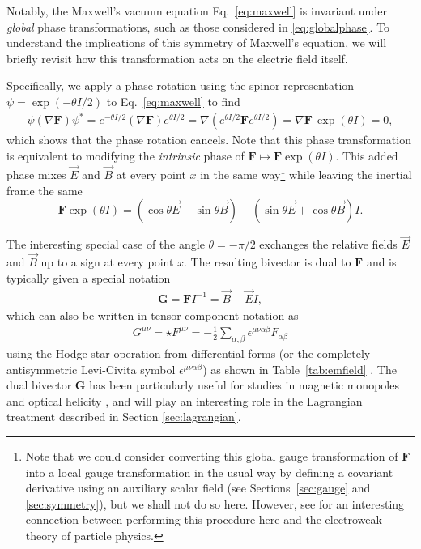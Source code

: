 \documentclass[1p,sort&compress]{elsarticle}
\numberwithin{equation}{section}
\newcommand{\rv}[1]{\vec{#1}}
\newcommand{\bv}[1]{\mathbf{#1}}
\begin{document}
Notably, the Maxwell's vacuum equation Eq.~\eqref{eq:maxwell} is invariant under \emph{global} phase transformations, such as those considered in \eqref{eq:globalphase}.  To understand the implications of this symmetry of Maxwell's equation, we will briefly revisit how this transformation acts on the electric field itself.

Specifically, we apply a phase rotation using the spinor representation $\psi = \exp(-\theta I / 2)$ to Eq.~\eqref{eq:maxwell} to find
\begin{align}\label{eq:dualsymmetry}
  \psi(\nabla \bv{F})\psi^* = e^{-\theta I /2}(\nabla \bv{F})e^{\theta I/2} = \nabla(e^{\theta I/2}\bv{F}e^{\theta I/2}) = \nabla \bv{F}\,\exp(\theta I) = 0,
\end{align}
which shows that the phase rotation cancels.  Note that this phase transformation is equivalent to modifying the \emph{intrinsic} phase of $\bv{F} \mapsto \bv{F} \exp(\theta I)$.  This added phase mixes $\rv{E}$ and $\rv{B}$ at every point $x$ in the same way\footnote{Note that we could consider converting this global gauge transformation of $\bv{F}$ into a local gauge transformation in the usual way by defining a covariant derivative using an auxiliary scalar field (see Sections~\ref{sec:gauge} and \ref{sec:symmetry}), but we shall not do so here.  However, see \cite{Vasconcellos2014} for an interesting connection between performing this procedure here and the electroweak theory of particle physics.} while leaving the inertial frame the same
\begin{equation}
  \bv{F} \exp(\theta I) = (\cos\theta \rv{E} - \sin\theta \rv{B}) + (\sin\theta \rv{E} + \cos\theta \rv{B})I.
\end{equation}

The interesting special case of the angle $\theta = -\pi/2$ exchanges the relative fields $\rv{E}$ and $\rv{B}$ up to a sign at every point $x$.  The resulting bivector is dual to $\bv{F}$ and is typically given a special notation 
\begin{align}\label{eq:dualfield}
  \bv{G} = \bv{F}I^{-1} = \rv{B} - \rv{E}I,
\end{align}
which can also be written in tensor component notation as 
\begin{align}
  G^{\mu\nu} = \star F^{\mu\nu} = -\frac{1}{2}\sum_{\alpha,\beta}\epsilon^{\mu\nu\alpha\beta}F_{\alpha\beta}
\end{align}
using the Hodge-star operation from differential forms (or the completely antisymmetric Levi-Civita symbol $\epsilon^{\mu\nu\alpha\beta}$) as shown in Table~\ref{tab:emfield} \cite{Bliokh2013}.  The dual bivector $\bv{G}$ has been particularly useful for studies in magnetic monopoles \cite{Dirac1931,Dirac1948,Cabibbo1962,Schwinger1966b,Rohrlich1966,Zwanziger1968,Zwanziger1971,Han1971,Mignani1975,Deser1976,
Deser1982,Gambini1979,Gambini1980,Schwartz1994,Pasti1995,Singleton1995,Singleton1996,Khoudeir1996,Kato2002,Shnir2005} and optical helicity \cite{Afanasiev1996,Trueba1996,Cameron2012,Cameron2012b,Bliokh2013,Philbin2013,Fernandez2012,Fernandez2013}, and will play an interesting role in the Lagrangian treatment described in Section \ref{sec:lagrangian}.  
\end{document}
